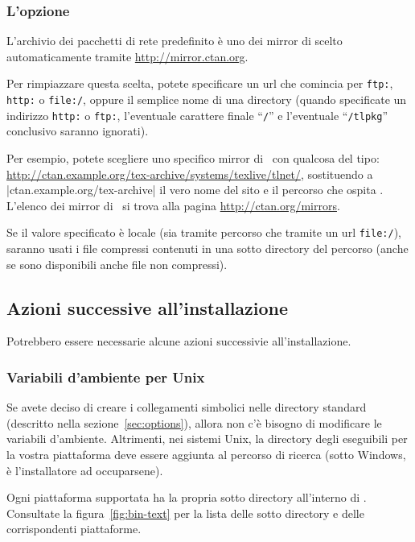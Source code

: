 \documentclass{article}
\begin{document}
\subsubsection{L'opzione }
\label{sec:location}

L'archivio dei pacchetti di rete predefinito è uno dei mirror di \CTAN{}
scelto automaticamente tramite \url{http://mirror.ctan.org}.

Per rimpiazzare questa scelta, potete specificare un url che comincia per
\texttt{ftp:}, \texttt{http:} o \texttt{file:/}, oppure il semplice nome
di una directory (quando specificate un indirizzo \texttt{http:} o
\texttt{ftp:}, l'eventuale carattere finale ``\texttt{/}'' e l'eventuale
``\texttt{/tlpkg}'' conclusivo saranno ignorati).

Per esempio, potete scegliere uno specifico mirror di \CTAN\ con qualcosa
del tipo:
\url{http://ctan.example.org/tex-archive/systems/texlive/tlnet/},
sostituendo a |ctan.example.org/tex-archive| il vero nome del sito e il
percorso che ospita \CTAN. L'elenco dei mirror di \CTAN\ si trova alla
pagina \url{http://ctan.org/mirrors}.

Se il valore specificato è locale (sia tramite percorso che tramite un url
\texttt{file:/}), saranno usati i file compressi contenuti in una sotto
directory  del percorso (anche se sono disponibili anche
file non compressi).


\subsection{Azioni successive all'installazione}
\label{sec:postinstall}

Potrebbero essere necessarie alcune azioni successivie all'installazione.

\subsubsection{Variabili d'ambiente per Unix}
\label{sec:env}

Se avete deciso di creare i collegamenti simbolici nelle directory standard
(descritto nella sezione~\ref{sec:options}), allora non c'è bisogno di
modificare le variabili d'ambiente. Altrimenti, nei sistemi Unix, la
directory degli eseguibili per la vostra piattaforma deve essere aggiunta al
percorso di ricerca (sotto Windows, è l'installatore ad occuparsene).

Ogni piattaforma supportata ha la propria sotto directory all'interno di
. Consultate la figura~\ref{fig:bin-text} per la lista
delle sotto directory e delle corrispondenti piattaforme.
\end{document}
